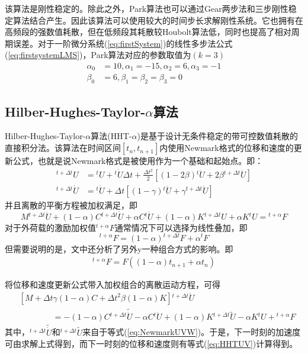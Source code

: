 该算法是刚性稳定的。除此之外，Park算法也可以通过Gear两步法\cite{Gear1971c}和三步刚性稳定算法\cite{Gear1971c}结合产生。因此该算法可以使用较大的时间步长求解刚性系统。它也拥有在高频段的强数值耗散，但在低频段其耗散较Houbolt算法低，同时也提高了相对周期误差。对于一阶微分系统(\ref{eq:firstSystem})的线性多步法公式(\ref{eq:firstsystemLMS})，Park算法对应的参数取值为$(k=3)$
\begin{equation}
\begin{split}
\alpha_0&=10,\alpha_1=-15,\alpha_2=6,\alpha_3=-1\\
\beta_0&=6,\beta_1=\beta_2=\beta_3=0
\end{split}
\end{equation}

\subsection{Hilber-Hughes-Taylor-$\alpha$算法}
Hilber-Hughes-Taylor-$\alpha$算法(HHT-$\alpha$)\cite{Hilber1977a}是基于设计无条件稳定的带可控数值耗散的直接积分法。该算法在时间区间$[t_n,t_{n+1}]$内使用Newmark格式的位移和速度的更新公式，也就是说Newmark格式是被使用作为一个基础和起始点。即：
\begin{subequations}
\begin{align}
{^{t+\Delta t}\!{U}}&={^t\!U}+{^t\!\dot{U}}\Delta t+\frac{\Delta t^2}{2}[(1-2\beta){^t\!\ddot{U}}+2\beta{^{t+\Delta t}\!\ddot{U}}]\\
{^{t+\Delta t}\!\dot{U}}&={^t\!\dot{U}}+\Delta t[(1-\gamma){^t\!\ddot{U}}+\gamma{^{t+\Delta t}\!\ddot{U}}]
\end{align}\label{eq:HHTUV}
\end{subequations}
并且离散的平衡方程被加权满足，即
\begin{equation}
M{^{t+\Delta t}\!\ddot{U}}+(1-\alpha)C{^{t+\Delta t}\!\dot{U}}+\alpha C{^{t}\!\dot{U}}+(1-\alpha)K{^{t+\Delta t}\!U}+\alpha K{^t\!U}={^{t+\alpha}\!F}
\end{equation}
对于外荷载的激励加权值${^{t+\alpha}\!F}$通常情况下可以选择为线性叠加，即
\begin{equation}
{^{t+\alpha}\!F}=(1-\alpha){^{t+\Delta t}\!F}+\alpha{^t\!F}
\end{equation}
但需要说明的是，文中还分析了另外y一种组合方式的影响。即
\begin{align}
{^{t+\alpha}\!F}=F((1-\alpha)t_{n+1}+\alpha t_n)
\end{align}

将位移和速度更新公式带入加权组合的离散运动方程，可得
\begin{equation}
\begin{split}
&\left[M+\Delta t\gamma(1-\alpha)C+\Delta t^2\beta(1-\alpha)K\right]{^{t+\Delta t}\!\ddot{U}}\\
&\qquad\qquad=-(1-\alpha)C{^{t+\Delta t}\!\widetilde{\dot{U}}}-\alpha C{^t\!\dot{U}}+(1-\alpha)K{^{t+\Delta t}\!\widetilde{U}}-\alpha K{^t\!U}+{^{t+\alpha}\!F}
\end{split}
\end{equation}
其中，${^{t+\Delta t}\!\widetilde{\dot{U}}}$和${^{t+\Delta t}\!\widetilde{U}}$来自于等式(\ref{eq:NewmarkUVW})。于是，下一时刻的加速度可由求解上式得到，而下一时刻的位移和速度则有等式(\ref{eq:HHTUV})计算得到。

